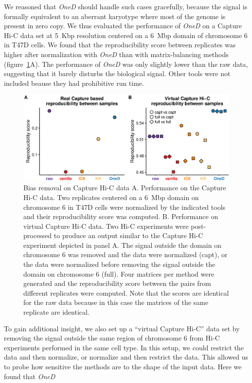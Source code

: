 \documentclass[a4,center,fleqn]{NAR}
\providecommand{\DIFadd}[1]{{\protect\color{red}#1}} %
\providecommand{\DIFdel}[1]{{\protect}}                      %
\providecommand{\DIFaddbegin}{} %
\providecommand{\DIFaddend}{} %
\providecommand{\DIFdelbegin}{} %
\providecommand{\DIFdelend}{} %
\providecommand{\DIFaddFL}[1]{\DIFadd{#1}} %
\begin{document}
\DIFadd{We reasoned that }\textit{\DIFadd{OneD}} \DIFadd{should handle such cases gracefully,
because the signal is formally equivalent to an aberrant karyotype where
most of the genome is present in zero copy. We thus evaluated the
performance of }\textit{\DIFadd{OneD}} \DIFadd{on a Capture Hi-C data set at 5~Kbp
resolution centered on a 6~Mbp domain of chromosome 6 in T47D cells. We
found that the reproducibility score between replicates was higher after
normalization }\DIFaddend with \textit{OneD} \DIFdelbegin \DIFdel{. The region around
72.5-75.0 Mbp showed an elevated amount of contacts in }\DIFdelend \DIFaddbegin \DIFadd{than with matrix-balancing methods
(figure~\ref{fig:chic}A). The performance of }\textit{\DIFadd{OneD}} \DIFadd{was only
slightly lower than }\DIFaddend the raw data\DIFdelbegin \DIFdel{. After
copy number correction, the signal is brought to the same level as the flanking regions. The result provided by }\DIFdelend \DIFaddbegin \DIFadd{, suggesting that it barely disturbs the
biological signal. Other tools were not included beause they had
prohibitive run time.
}

\begin{figure}
\centerline{\includegraphics[width=.49\textwidth]
  {nar_figures/figure_5.eps}}
\caption{\DIFaddFL{Bias removal on Capture Hi-C data A. Performance on the Capture
Hi-C data. Two replicates centered on a 6~Mbp domain on chromosome 6 in
T47D cells were normalized by the indicated tools and their
reproducibility score was computed. B. Performance on virtual Capture Hi-C
data. Two Hi-C experiments were post-processed to produce an output
similar to the Capture Hi-C experiment depicted in panel A. The signal
outside the domain on chromosome 6 was removed and the data were
normalized (capt), or the data were normalized before removing the signal
outside the domain on chromosome 6 (full). Four matrices per method were
generated and the reproducibility score between the pairs from different
replicates were computed. Note that the scores are identical for the raw
data because in this case the matrices of the same replicate are
identical.}}
\label{fig:chic}
\end{figure}

\DIFadd{To gain additional insight, we also set up a ``virtual Capture Hi-C'' data
set by removing the signal outside the same region of chromosome 6 from
Hi-C experiments performed in the same cell type. In this setup, we could
restrict the data and then normalize, or normalize and then restrict the
data. This allowed us to probe how sensitive the methods are to the shape
of the input data. Here we found that }\DIFaddend \textit{OneD} \DIFdelbegin \DIFdel{is not necessarily
the right one (see Discussion), but at least it does not correct copy
number variations as a side effect of some other criteria. }%
\end{document}
